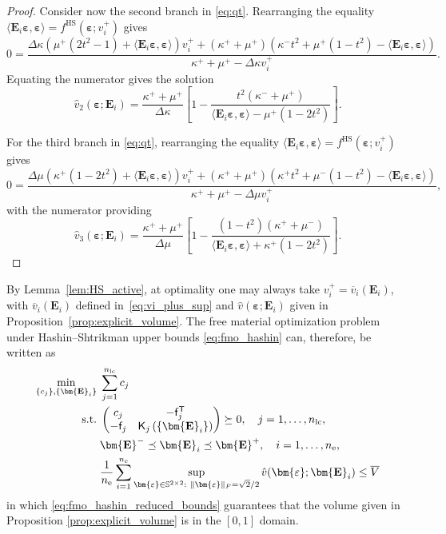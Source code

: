 \documentclass[preprint,3p]{elsarticle}
\newcommand{\tenss}[1]{\bm{\mathbf{#1}}}            %
\newcommand{\tensf}[1]{\bm{\mathbf{#1}}}            %
\newcommand{\trn}{\mathsf{T}}                       %
\newcommand{\strain}{\tenss{\varepsilon}}           %
\newcommand{\Ei}{\tensf{E}_i}                       %
\newcommand{\Emin}{\tensf{E}^{-}}                   %
\newcommand{\Emax}{\tensf{E}^{+}}                   %
\newcommand{\nel}{n_\mathrm{e}}                     %
\newcommand{\nlc}{n_\mathrm{lc}}                    %
\newcommand{\semtrx}[1]{\ifcat\noexpand#1\relax\bm{#1}\else\mathsf{#1}\fi}
\newcommand{\sevek}[1]{\ifcat\noexpand#1\relax\bm{#1}\else\mathsf{#1}\fi}
\begin{document}
\begin{proof}
Consider now the second branch in \eqref{eq:qt}. Rearranging the equality $\langle \Ei \strain, \strain\rangle = f^{\mathrm{HS}}(\strain;v_i^+)$ gives
%
\begin{equation}
    0 = \frac{\Delta\kappa (\mu^+ (2t^2 -1) + \langle\Ei\strain, \strain\rangle)v_i^+ +(\kappa^+ + \mu^+) (\kappa^- t^2 + \mu^+ (1-t^2) - \langle\Ei\strain, \strain\rangle)}{\kappa^+ + \mu^+ - \Delta\kappa v_i^+}.
\end{equation}
%
Equating the numerator gives the solution
%
\begin{equation}
    \hat{v}_2 (\strain;\Ei) = \frac{\kappa^+ + \mu^+}{\Delta\kappa}\left[1 - \frac{t^2 (\kappa^- + \mu^+)}{ \langle\Ei\strain, \strain\rangle - \mu^+ (1 - 2t^2)}\right].
\end{equation}

For the third branch in \eqref{eq:qt}, rearranging the equality $\langle \Ei \strain, \strain\rangle = f^{\mathrm{HS}}(\strain;v_i^+)$ gives
%
\begin{equation}
    0 = \frac{\Delta\mu (\kappa^+ (1-2t^2) + \langle\Ei\strain, \strain\rangle)v_i^+ + (\kappa^+ + \mu^+) (\kappa^+ t^2 + \mu^- (1-t^2) - \langle\Ei\strain, \strain\rangle) }{\kappa^+ + \mu^+ - \Delta\mu v_i^+},
\end{equation}
%
with the numerator providing
%
\begin{equation}
    \hat{v}_3 (\strain;\Ei) = \frac{\kappa^+ + \mu^+}{\Delta\mu} \left[1 - \frac{(1-t^2) (\kappa^+ + \mu^-)}{\langle\Ei\strain, \strain\rangle + \kappa^+ (1 - 2t^2)}\right].
\end{equation}
\end{proof}
%
By Lemma~\ref{lem:HS_active}, at optimality one may always take $v_i^+=\overline{v}_i(\Ei)$, with $\overline{v}_i(\Ei)$ defined in~\eqref{eq:vi_plus_sup} and $\hat{v}(\strain;\Ei)$ given in Proposition~\ref{prop:explicit_volume}. The free material optimization problem under Hashin--Shtrikman upper bounds \eqref{eq:fmo_hashin} can, therefore, be written as
%
\begin{subequations}\label{eq:fmo_hashin_reduced}
\begin{align}
    \min_{\{c_j\}, \{\Ei\}} \; & \sum_{j=1}^{\nlc} c_j \label{eq:fmo_hashin_reduced_compliance}\\
    \mathrm{s.t.}\; & \begin{pmatrix}
        c_j & -\sevek{f}_j^\trn\\
        -\sevek{f}_j & \semtrx{K}_j\left(\{\Ei\}\right)
    \end{pmatrix}\succeq 0, \quad j = 1,\dots,\nlc,\label{eq:fmo_hashin_reduced_lmi}\\
    & \Emin \preceq \Ei \preceq \Emax,\quad i = 1,\dots,\nel,\label{eq:fmo_hashin_reduced_bounds}\\
    & \frac{1}{\nel}\sum_{i=1}^{\nel} \sup_{\strain\in\mathbb{S}^{2\times2}:\ \lVert\strain\rVert_F = \sqrt{2}/2} \hat{v}(\strain;\Ei) \le \overline{V}\label{eq:fmo_hashin_reduced_volume}
\end{align}
\end{subequations}
%
in which \eqref{eq:fmo_hashin_reduced_bounds} guarantees that the volume given in Proposition \ref{prop:explicit_volume} is in the $[0,1]$ domain.
\end{document}
